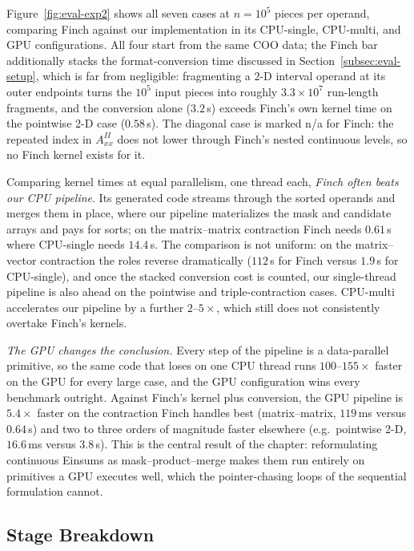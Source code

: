 Figure~\ref{fig:eval-exp2} shows all seven cases at $n = 10^{5}$
pieces per operand, comparing Finch against our implementation in its
CPU-single, CPU-multi, and GPU configurations. All four start from the
same COO data; the Finch bar additionally stacks the format-conversion
time discussed in Section~\ref{subsec:eval-setup}, which is far from
negligible: fragmenting a 2-D interval operand at its outer endpoints
turns the $10^{5}$ input pieces into roughly $3.3 \times 10^{7}$
run-length fragments, and the conversion alone ($3.2$\,s) exceeds
Finch's own kernel time on the pointwise 2-D case ($0.58$\,s). The
diagonal case is marked n/a for Finch: the repeated index in
$A^{II}_{xx}$ does not lower through Finch's nested continuous levels,
so no Finch kernel exists for it.

Comparing kernel times at equal parallelism, one thread each,
\emph{Finch often beats our CPU pipeline}. Its generated code streams
through the sorted operands and merges them in place, where our
pipeline materializes the mask and candidate arrays and pays for
sorts; on the matrix--matrix contraction Finch needs $0.61$\,s where
CPU-single needs $14.4$\,s. The comparison is not uniform: on the
matrix--vector contraction the roles reverse dramatically ($112$\,s
for Finch versus $1.9$\,s for CPU-single), and once the stacked
conversion cost is counted, our single-thread pipeline is also ahead
on the pointwise and triple-contraction cases. CPU-multi accelerates
our pipeline by a further $2$--$5\times$, which still does not
consistently overtake Finch's kernels.

\emph{The GPU changes the conclusion.} Every step of the pipeline is a
data-parallel primitive, so the same code that loses on one CPU thread
runs $100$--$155\times$ faster on the GPU for every large case, and
the GPU configuration wins every benchmark outright. Against Finch's
kernel plus conversion, the GPU pipeline is $5.4\times$ faster on the
contraction Finch handles best (matrix--matrix, $119$\,ms versus
$0.64$\,s) and two to three orders of magnitude faster elsewhere
(e.g.\ pointwise 2-D, $16.6$\,ms versus $3.8$\,s). This is the central
result of the chapter: reformulating continuous Einsums as
mask--product--merge makes them run entirely on primitives a GPU
executes well, which the pointer-chasing loops of the sequential
formulation cannot.

\subsection{Stage Breakdown}
\label{subsec:eval-breakdown}

